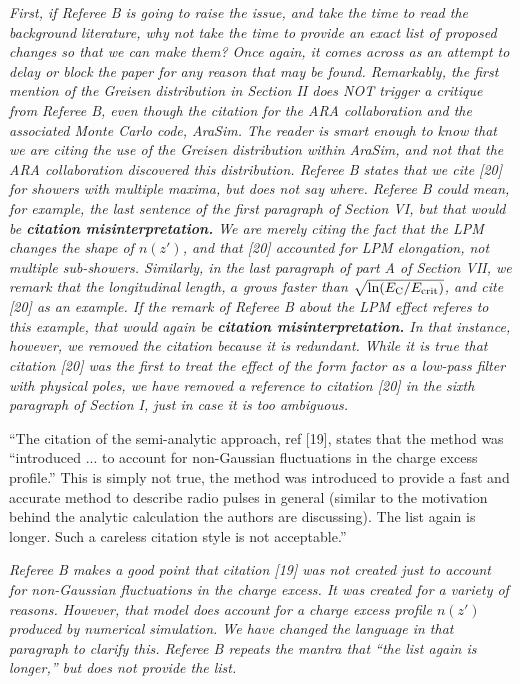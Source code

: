\documentclass[12pt]{article}
\begin{document}
\textit{First, if Referee B is going to raise the issue, and take the time to read the background literature, why not take the time to provide an exact list of proposed changes so that we can make them?  Once again, it comes across as an attempt to delay or block the paper for any reason that may be found.  Remarkably, the first mention of the Greisen distribution in Section II does NOT trigger a critique from Referee B, even though the citation for the ARA collaboration and the associated Monte Carlo code, AraSim.  The reader is smart enough to know that we are citing the use of the Greisen distribution within AraSim, and not that the ARA collaboration discovered this distribution.  Referee B states that we cite [20] for showers with multiple maxima, but does not say where.  Referee B could mean, for example, the last sentence of the first paragraph of Section VI, but that would be \textbf{citation misinterpretation.}  We are merely citing the fact that the LPM changes the shape of $n(z')$, and that [20] accounted for LPM elongation, not multiple sub-showers.  Similarly, in the last paragraph of part A of Section VII, we remark that the longitudinal length, $a$ grows faster than $\sqrt{\ln(E_{\rm C}/E_{\rm crit})}$, and cite [20] as an example.  If the remark of Referee B about the LPM effect referes to this example, that would again be \textbf{citation misinterpretation.}  In that instance, however, we removed the citation because it is redundant.  While it is true that citation [20] was the first to treat the effect of the form factor as a low-pass filter with physical poles, we have removed a reference to citation [20] in the sixth paragraph of Section I, just in case it is too ambiguous.}

``The citation of the semi-analytic approach, ref [19], states that the method was ``introduced ... to account for non-Gaussian fluctuations in the charge excess profile.''  This is simply not true, the method was introduced to provide a fast and accurate method to describe radio pulses in general (similar to the motivation behind the analytic calculation the authors are discussing). The list again is longer. Such a careless citation style is not acceptable.''

\textit{Referee B makes a good point that citation [19] was not created just to account for non-Gaussian fluctuations in the charge excess.  It was created for a variety of reasons.  However, that model does account for a charge excess profile $n(z')$ produced by numerical simulation.  We have changed the language in that paragraph to clarify this.  Referee B repeats the mantra that ``the list again is longer,'' but does not provide the list.}
\end{document}
